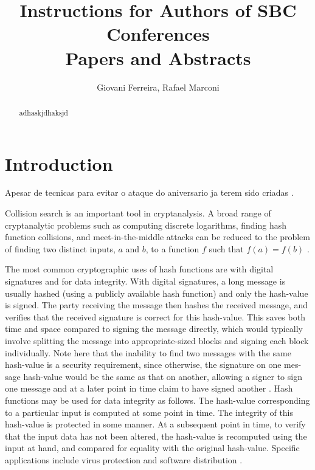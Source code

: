 \documentclass[12pt]{article}
\title{Instructions for Authors of SBC Conferences\\ Papers and Abstracts}
\author{Giovani Ferreira\inst{1}, Rafael Marconi\inst{1} }
\begin{document}
\maketitle

\begin{abstract}
adhaskjdhaksjd \cite{tanenbaum2002distributed}
\end{abstract}

\section{Introduction}

Apesar de tecnicas para evitar o ataque do aniversario ja terem sido criadas \cite{aiello1996foiling}.

Collision search is an important tool in cryptanalysis. A broad range of cryptanalytic problems
such as computing discrete logarithms, finding hash function collisions, and meet-in-the-middle
attacks can be reduced to the problem of finding two distinct inputs, \(a\) and \(b\), to a 
function \(f\) such that \(f(a) = f(b)\) \cite{van1999parallel}.

The most common cryptographic uses of hash functions are with digital signatures and
for data integrity.  With digital signatures, a long message is usually hashed (using a publicly 
available hash function) and only the hash-value is signed.  The party receiving the
message then hashes the received message, and verifies that the received signature is correct 
for this hash-value. This saves both time and space compared to signing the message
directly, which would typically involve splitting the message into appropriate-sized blocks
and signing each block individually. Note here that the inability to find two messages with
the same hash-value is a security requirement, since otherwise, the signature on one mes-
sage hash-value would be the same as that on another, allowing a signer to sign one message
and at a later point in time claim to have signed another \cite{menezes1996handbook}.
Hash functions may be used for data integrity as follows. The hash-value corresponding to a particular 
input is computed at some point in time. The integrity of this hash-value is protected in some manner. 
At a subsequent point in time, to verify that the input data has not been altered, the hash-value is 
recomputed using the input at hand, and compared for equality with the original hash-value. Specific 
applications include virus protection and software distribution \cite{menezes1996handbook}.
\end{document}
